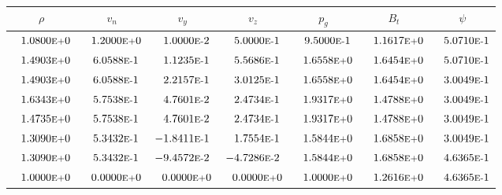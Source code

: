 \begin{tabular*}{\textwidth}{@{\extracolsep{\fill}} ccccccc}
\\ 
\hline 
\hline 
$\rho$ & $v_n$ & $v_y$ & $v_z$ & $p_g$ & $B_t$ & $\psi$ \\ 
\hline 
$\phantom{-} 1.0800\mbox{\sc{e}\smaller{+}}0$ & $\phantom{-} 1.2000\mbox{\sc{e}\smaller{+}}0$ & $\phantom{-} 1.0000\mbox{\sc{e}\smaller{-}}2$ & $\phantom{-} 5.0000\mbox{\sc{e}\smaller{-}}1$ & $\phantom{-} 9.5000\mbox{\sc{e}\smaller{-}}1$ & $\phantom{-} 1.1617\mbox{\sc{e}\smaller{+}}0$ & $\phantom{-} 5.0710\mbox{\sc{e}\smaller{-}}1$ \\ 
$\phantom{-} 1.4903\mbox{\sc{e}\smaller{+}}0$ & $\phantom{-} 6.0588\mbox{\sc{e}\smaller{-}}1$ & $\phantom{-} 1.1235\mbox{\sc{e}\smaller{-}}1$ & $\phantom{-} 5.5686\mbox{\sc{e}\smaller{-}}1$ & $\phantom{-} 1.6558\mbox{\sc{e}\smaller{+}}0$ & $\phantom{-} 1.6454\mbox{\sc{e}\smaller{+}}0$ & $\phantom{-} 5.0710\mbox{\sc{e}\smaller{-}}1$ \\ 
$\phantom{-} 1.4903\mbox{\sc{e}\smaller{+}}0$ & $\phantom{-} 6.0588\mbox{\sc{e}\smaller{-}}1$ & $\phantom{-} 2.2157\mbox{\sc{e}\smaller{-}}1$ & $\phantom{-} 3.0125\mbox{\sc{e}\smaller{-}}1$ & $\phantom{-} 1.6558\mbox{\sc{e}\smaller{+}}0$ & $\phantom{-} 1.6454\mbox{\sc{e}\smaller{+}}0$ & $\phantom{-} 3.0049\mbox{\sc{e}\smaller{-}}1$ \\ 
$\phantom{-} 1.6343\mbox{\sc{e}\smaller{+}}0$ & $\phantom{-} 5.7538\mbox{\sc{e}\smaller{-}}1$ & $\phantom{-} 4.7601\mbox{\sc{e}\smaller{-}}2$ & $\phantom{-} 2.4734\mbox{\sc{e}\smaller{-}}1$ & $\phantom{-} 1.9317\mbox{\sc{e}\smaller{+}}0$ & $\phantom{-} 1.4788\mbox{\sc{e}\smaller{+}}0$ & $\phantom{-} 3.0049\mbox{\sc{e}\smaller{-}}1$ \\ 
$\phantom{-} 1.4735\mbox{\sc{e}\smaller{+}}0$ & $\phantom{-} 5.7538\mbox{\sc{e}\smaller{-}}1$ & $\phantom{-} 4.7601\mbox{\sc{e}\smaller{-}}2$ & $\phantom{-} 2.4734\mbox{\sc{e}\smaller{-}}1$ & $\phantom{-} 1.9317\mbox{\sc{e}\smaller{+}}0$ & $\phantom{-} 1.4788\mbox{\sc{e}\smaller{+}}0$ & $\phantom{-} 3.0049\mbox{\sc{e}\smaller{-}}1$ \\ 
$\phantom{-} 1.3090\mbox{\sc{e}\smaller{+}}0$ & $\phantom{-} 5.3432\mbox{\sc{e}\smaller{-}}1$ & $-1.8411\mbox{\sc{e}\smaller{-}}1$ & $\phantom{-} 1.7554\mbox{\sc{e}\smaller{-}}1$ & $\phantom{-} 1.5844\mbox{\sc{e}\smaller{+}}0$ & $\phantom{-} 1.6858\mbox{\sc{e}\smaller{+}}0$ & $\phantom{-} 3.0049\mbox{\sc{e}\smaller{-}}1$ \\ 
$\phantom{-} 1.3090\mbox{\sc{e}\smaller{+}}0$ & $\phantom{-} 5.3432\mbox{\sc{e}\smaller{-}}1$ & $-9.4572\mbox{\sc{e}\smaller{-}}2$ & $-4.7286\mbox{\sc{e}\smaller{-}}2$ & $\phantom{-} 1.5844\mbox{\sc{e}\smaller{+}}0$ & $\phantom{-} 1.6858\mbox{\sc{e}\smaller{+}}0$ & $\phantom{-} 4.6365\mbox{\sc{e}\smaller{-}}1$ \\ 
$\phantom{-} 1.0000\mbox{\sc{e}\smaller{+}}0$ & $\phantom{-} 0.0000\mbox{\sc{e}\smaller{+}}0$ & $\phantom{-} 0.0000\mbox{\sc{e}\smaller{+}}0$ & $\phantom{-} 0.0000\mbox{\sc{e}\smaller{+}}0$ & $\phantom{-} 1.0000\mbox{\sc{e}\smaller{+}}0$ & $\phantom{-} 1.2616\mbox{\sc{e}\smaller{+}}0$ & $\phantom{-} 4.6365\mbox{\sc{e}\smaller{-}}1$ \\ 
\hline 
\end{tabular*} 

